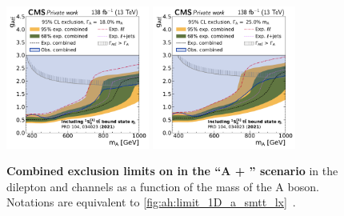 \begin{figure}[!ph]
    \\
    \includegraphics[width=0.42\textwidth]{figures/ah/limits_combined/etat/A_limit_w18p0_g-scan.pdf}%
    \hspace*{0.05\textwidth}%
    \includegraphics[width=0.42\textwidth]{figures/ah/limits_combined/etat/A_limit_w25p0_g-scan.pdf}
    \caption{%
    \textbf{Combined exclusion limits on \gAtt in the ``A + \etat'' scenario} in the dilepton and \ljets channels as a function of the mass of the A boson. Notations are equivalent to \cref{fig:ah:limit_1D_a_smtt_lx}~\cite{CMS:HIG-22-013}.
    }
    \label{fig:ah:limit_1D_a_etat_lx}
\end{figure}
    
